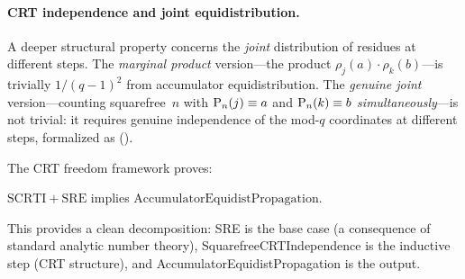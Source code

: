 \paragraph{CRT independence and joint equidistribution.}
A deeper structural property concerns the \emph{joint} distribution of
residues at different steps.  The \emph{marginal product} version---the
product $\rho_j(a) \cdot \rho_k(b)$---is trivially $1/(q{-}1)^2$ from
accumulator equidistribution.  The \emph{genuine joint}
version---counting squarefree~$n$ with $\mathrm{P}_{n}(j) \equiv a$ and
$\mathrm{P}_{n}(k) \equiv b$ \emph{simultaneously}---is not trivial: it
requires genuine independence of the mod-$q$ coordinates at different
steps, formalized as 
().

The CRT freedom framework proves:

\begin{theorem}
$\mathrm{SCRTI} + \mathrm{SRE}$ implies
$\mathrm{AccumulatorEquidistPropagation}$.
\end{theorem}

\noindent This provides a clean decomposition: SRE is the base case
(a consequence of standard analytic number theory),
SquarefreeCRTIndependence is the inductive step (CRT structure), and
AccumulatorEquidistPropagation is the output.

